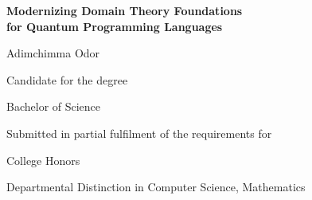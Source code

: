 
\begin{titlepage}
\selectfont  %
\singlespacing               %
\centering

\vspace*{0.5in}

{\fontsize{24}{28}\selectfont\bfseries
  Modernizing Domain Theory Foundations\\[0.4em]
  for Quantum Programming Languages
  \par
}

\vspace{0.5in}

{\fontsize{18}{22}\selectfont
  Adimchimma Odor
  \par
}

\vspace{0.6in}

{\fontsize{14}{18}\selectfont
  Candidate for the degree\par
}
\vspace{0.15in}
{\fontsize{14}{18}\selectfont
  Bachelor of Science
  \par
}

\vspace{0.4in}

{\fontsize{12}{16}\selectfont
  Submitted in partial fulfilment of the requirements for\par
}
\vspace{0.1in}
{\fontsize{12}{16}\selectfont
  College Honors\par
}
\vspace{0.05in}
{\fontsize{12}{16}\selectfont
  Departmental Distinction in Computer Science, Mathematics
  \par
}

\vspace{1.5in}

\begin{flushleft}
\hspace{0.5in}
\begin{minipage}{5in}


\end{minipage}
\end{flushleft}
\end{titlepage}

